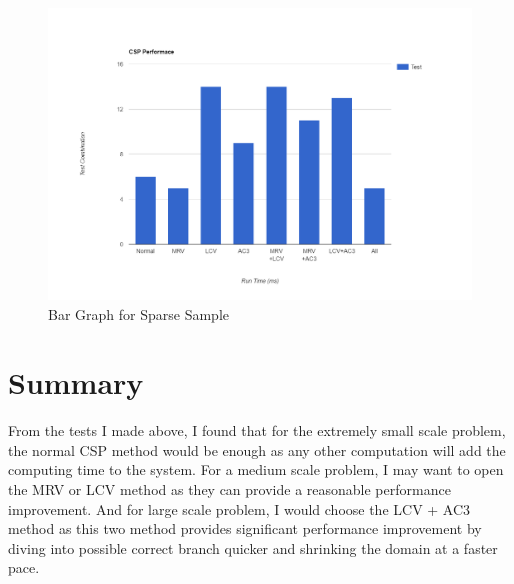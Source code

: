 \documentclass{article}
\begin{document}
\begin{figure}[H]
\centering
\includegraphics[width=\linewidth]{SparseBarGraph}
\caption{Bar Graph for Sparse Sample}
\end{figure}

\section{Summary}
From the tests I made above, I found that for the extremely small scale problem, the normal CSP method would be enough as any other computation will add the computing time to the system. For a medium scale problem, I may want to open the MRV or LCV method as they can provide a reasonable performance improvement. And for large scale problem, I would choose the LCV + AC3 method as this two method provides significant performance improvement by diving into possible correct branch quicker and shrinking the domain at a faster pace.
\end{document}
